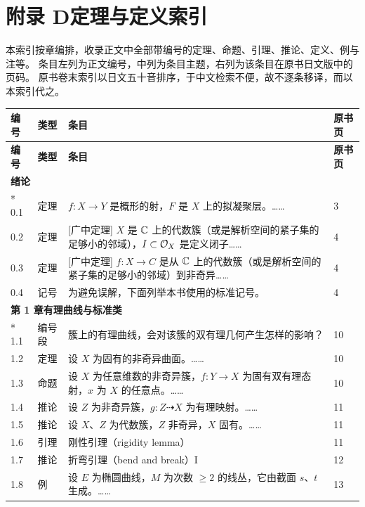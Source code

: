 \chapter*{附录 D\quad 定理与定义索引}

\noindent 本索引按章编排，收录正文中全部带编号的定理、命题、引理、推论、定义、例与注等。
条目左列为正文编号，中列为条目主题，右列为该条目在原书日文版中的页码。
原书卷末索引以日文五十音排序，于中文检索不便，故不逐条移译，而以本索引代之。

\begingroup
\small
\begin{longtable}{@{}p{}p{}p{}p{}@{}}
\textbf{编号} & \textbf{类型} & \textbf{条目} & \textbf{原书页} \\
\hline
\endfirsthead
\textbf{编号} & \textbf{类型} & \textbf{条目} & \textbf{原书页} \\
\hline
\endhead
\multicolumn{4}{l}{\textbf{绪论}}\\*
0.1 & 定理 & $f\colon X\to Y$ 是概形的射，$F$ 是 $X$ 上的拟凝聚层。…… & 3 \\
0.2 & 定理 & [广中定理] $X$ 是 $\mathbb{C}$ 上的代数簇（或是解析空间的紧子集的足够小的邻域），$I\subset\mathcal{O}_X$ 是定义闭子…… & 4 \\
0.3 & 定理 & [广中定理] $f\colon X\to C$ 是从 $\mathbb{C}$ 上的代数簇（或是解析空间的紧子集的足够小的邻域）到非奇异…… & 4 \\
0.4 & 记号 & 为避免误解，下面列举本书使用的标准记号。 & 4 \\
\multicolumn{4}{l}{\textbf{第 1 章\quad 有理曲线与标准类}}\\*
1.1 & 编号段 & 簇上的有理曲线，会对该簇的双有理几何产生怎样的影响？ & 10 \\
1.2 & 定理 & 设 $X$ 为固有的非奇异曲面。…… & 10 \\
1.3 & 命题 & 设 $X$ 为任意维数的非奇异簇，$f:Y\to X$ 为固有双有理态射，$x$ 为 $X$ 的任意点。…… & 10 \\
1.4 & 推论 & 设 $Z$ 为非奇异簇，$g: Z\dashrightarrow X$ 为有理映射。…… & 11 \\
1.5 & 推论 & 设 $X$、$Z$ 为代数簇，$Z$ 非奇异，$X$ 固有。…… & 11 \\
1.6 & 引理 & 刚性引理（rigidity lemma） & 11 \\
1.7 & 推论 & 折弯引理（bend and break）I & 12 \\
1.8 & 例 & 设 $E$ 为椭圆曲线，$M$ 为次数 $\ge 2$ 的线丛，它由截面 $s$、$t$ 生成。…… & 13 \\

\end{longtable}
